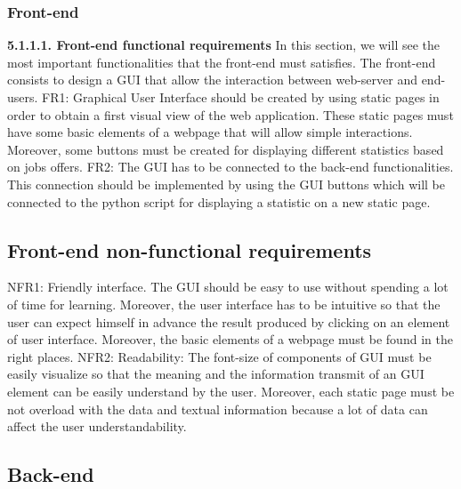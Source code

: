 \documentclass[conference,compsoc]{IEEEtran}
\begin{document}
\subsubsection{Front-end}
\noindent
\newline 
\textbf{5.1.1.1. Front-end functional requirements}
\newline
In this section, we will see the most important functionalities that the front-end must satisfies. The front-end consists to design a GUI that allow the interaction between web-server and end-users. 
\newline\newline
FR1: Graphical User Interface should be created by using static pages in order to obtain a first visual view of the web application. These static pages must have some basic elements of a webpage that will allow simple interactions. Moreover, some buttons must be created for displaying different statistics based on jobs offers. 
\newline\newline 
FR2: The GUI has to be connected to the back-end functionalities. This connection should be implemented by using the GUI buttons which will be connected to the python script for displaying a statistic on a new static page. 
\subsection{Front-end non-functional requirements}
NFR1: Friendly interface. The GUI should be easy to use without spending a lot of time for learning. Moreover, the user interface has to be intuitive so that the user can expect himself in advance the result produced by clicking on an element of user interface. Moreover, the basic elements of a webpage must be found in the right places. 
\newline\newline
NFR2: Readability: The font-size of components of GUI must be easily visualize so that the meaning and the information transmit of an GUI element can be easily understand by the user. Moreover, each static page must be not overload with the data and textual information because a lot of data can affect the user understandability. 
\subsection{Back-end}
\end{document}

